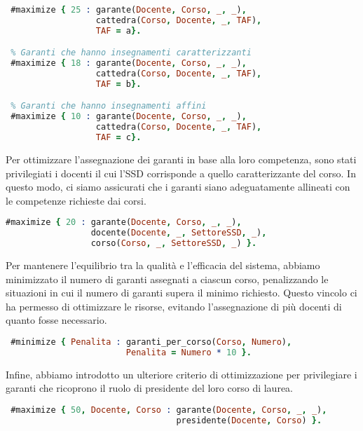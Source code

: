 \begin{lstlisting}[language=prolog, caption=Gestione delle priorità del TAF.]
 % Garanti che hanno insegnamenti di base
 #maximize { 25 : garante(Docente, Corso, _, _), 
                  cattedra(Corso, Docente, _, TAF), 
                  TAF = a}.

 % Garanti che hanno insegnamenti caratterizzanti
 #maximize { 18 : garante(Docente, Corso, _, _), 
                  cattedra(Corso, Docente, _, TAF), 
                  TAF = b}.

 % Garanti che hanno insegnamenti affini
 #maximize { 10 : garante(Docente, Corso, _, _), 
                  cattedra(Corso, Docente, _, TAF), 
                  TAF = c}.
\end{lstlisting}

Per ottimizzare l'assegnazione dei garanti in base alla loro competenza, sono stati 
privilegiati i docenti il cui l'SSD corrisponde a quello caratterizzante del corso.
In questo modo, ci siamo assicurati che i garanti siano adeguatamente allineati con 
le competenze richieste dai corsi.

\begin{lstlisting}[language=prolog, caption=Preferenza dei garanti con macrosettore coerente a quello del corso.]
% Ottimizzare i garanti con SSD caratterizzante
#maximize { 20 : garante(Docente, Corso, _, _), 
                 docente(Docente, _, SettoreSSD, _), 
                 corso(Corso, _, SettoreSSD, _) }.
\end{lstlisting}

Per mantenere l'equilibrio tra la qualità e l'efficacia del sistema, abbiamo 
minimizzato il numero di garanti assegnati a ciascun corso, penalizzando le situazioni 
in cui il numero di garanti supera il minimo richiesto. Questo vincolo ci ha permesso 
di ottimizzare le risorse, evitando l'assegnazione di più docenti di quanto fosse necessario.

\begin{lstlisting}[language=prolog, caption=Minimizzazione dei garanti per corso di laurea.]
 % Minimizzo il numero di garanti per ogni corso
 #minimize { Penalita : garanti_per_corso(Corso, Numero),
                        Penalita = Numero * 10 }.
\end{lstlisting}

Infine, abbiamo introdotto un ulteriore criterio di ottimizzazione per privilegiare i 
garanti che ricoprono il ruolo di presidente del loro corso di laurea. 

\begin{lstlisting}[language=prolog, caption=Massimizzazione dei presidenti come garanti.]
 % Massimizza i presidenti che sono garanti nel loro corso di laurea
 #maximize { 50, Docente, Corso : garante(Docente, Corso, _, _), 
                                  presidente(Docente, Corso) }.
\end{lstlisting}